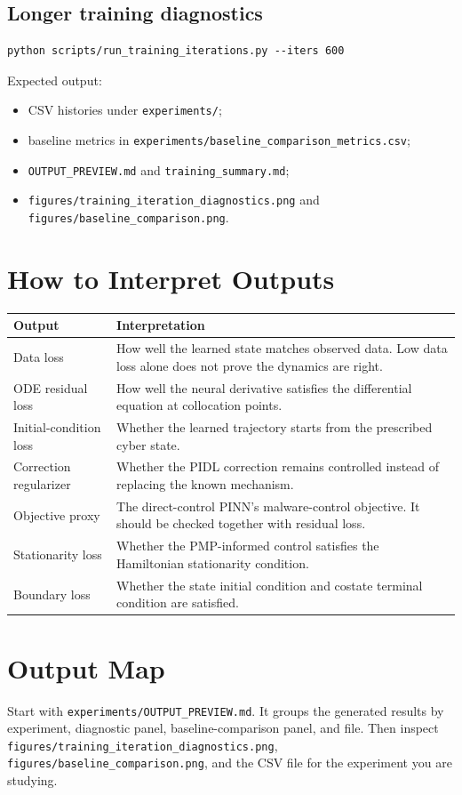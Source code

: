 \documentclass[11pt,a4paper]{article}
\begin{document}
\subsection{Longer training diagnostics}
\begin{lstlisting}[style=pythonstyle]
python scripts/run_training_iterations.py --iters 600
\end{lstlisting}
Expected output:
\begin{itemize}
\item CSV histories under \texttt{experiments/};
\item baseline metrics in \texttt{experiments/baseline\_comparison\_metrics.csv};
\item \texttt{OUTPUT\_PREVIEW.md} and \texttt{training\_summary.md};
\item \texttt{figures/training\_iteration\_diagnostics.png} and \texttt{figures/baseline\_comparison.png}.
\end{itemize}

\section{How to Interpret Outputs}
\begin{longtable}{p{}p{}}
\toprule
Output & Interpretation \\
\midrule
Data loss & How well the learned state matches observed data. Low data loss alone does not prove the dynamics are right. \\
ODE residual loss & How well the neural derivative satisfies the differential equation at collocation points. \\
Initial-condition loss & Whether the learned trajectory starts from the prescribed cyber state. \\
Correction regularizer & Whether the PIDL correction remains controlled instead of replacing the known mechanism. \\
Objective proxy & The direct-control PINN's malware-control objective. It should be checked together with residual loss. \\
Stationarity loss & Whether the PMP-informed control satisfies the Hamiltonian stationarity condition. \\
Boundary loss & Whether the state initial condition and costate terminal condition are satisfied. \\
\bottomrule
\end{longtable}

\section{Output Map}
Start with \texttt{experiments/OUTPUT\_PREVIEW.md}. It groups the generated results by experiment, diagnostic panel, baseline-comparison panel, and file. Then inspect \texttt{figures/training\_iteration\_diagnostics.png}, \texttt{figures/baseline\_comparison.png}, and the CSV file for the experiment you are studying.
\end{document}
